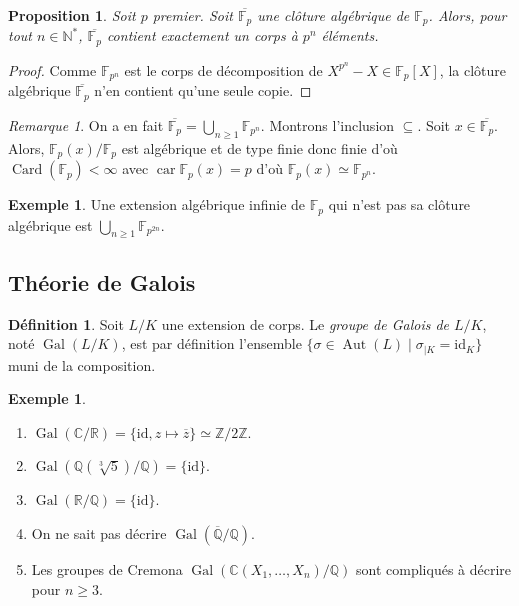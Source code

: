 \documentclass{article}
\newcommand{\id}{\mathrm{id}}
\newcommand{\N}{\mathbb{N}}
\newcommand{\Z}{\mathbb{Z}}
\newcommand{\Q}{\mathbb{Q}}
\newcommand{\Qbar}{\overline{\mathbb{Q}}}
\newcommand{\R}{\mathbb{R}}
\newcommand{\C}{\mathbb{C}}
\newcommand{\F}{\mathbb{F}}
\DeclareMathOperator{\Card}{Card}
\DeclareMathOperator{\Gal}{Gal}
\DeclareMathOperator{\car}{car}
\DeclareMathOperator{\Aut}{Aut}
\theoremstyle{plain}
\newtheorem{proposition}[theorem]{Proposition}
\theoremstyle{definition}
\newtheorem{definition}[theorem]{Définition}
\newtheorem{example}[theorem]{Exemple}
\theoremstyle{remark}
\newtheorem*{remark}{Remarque}
\begin{document}
\begin{proposition}
    Soit $p$ premier. Soit $\overline{\F_p}$ une clôture algébrique de $\F_p$. Alors, pour tout $n \in \N^*$, $\overline{\F_p}$ contient exactement un corps à $p^n$ éléments.
\end{proposition}

\begin{proof}
    Comme $\F_{p^n}$ est le corps de décomposition de $X^{p^n} - X \in \F_p [X]$, la clôture algébrique $\overline{\F_p}$ n'en contient qu'une seule copie.
\end{proof}

\begin{remark}
    On a en fait $\overline{\F_p} = \bigcup\limits_{n\ge 1} \F_{p^n}$. Montrons l'inclusion $\subseteq$. Soit $x\in \overline{\F_p}$. Alors, $\F_p (x) / \F_p$ est algébrique et de type finie donc finie d'où $\Card(\F_p) < \infty$ avec $\car \F_p (x) = p$ d'où $\F_p (x) \simeq \F_{p^n}$.
\end{remark}

\begin{example}
    Une extension algébrique infinie de $\F_p$ qui n'est pas sa clôture algébrique est $\bigcup\limits_{n\ge 1} \F_{p^{2n}}$.
\end{example}

\subsection{Théorie de Galois}

\begin{definition}
    Soit $L/K$ une extension de corps. Le \emph{groupe de Galois de $L/K$}, noté $\Gal(L/K)$, est par définition l'ensemble $\{\sigma \in \Aut(L) \mid \sigma_{\mid K} = \id_K\}$ muni de la composition.
\end{definition}

\begin{example} \leavevmode
    \begin{enumerate}
        \item $\Gal(\C/\R) = \{\id,z\mapsto\overline{z}\} \simeq \Z/2\Z$.
        \item $\Gal(\Q(\sqrt[3]{5})/\Q) = \{\id\}$.
        \item $\Gal(\R/\Q) = \{\id\}$.
        \item On ne sait pas décrire $\Gal(\Qbar/\Q)$.
        \item Les groupes de Cremona $\Gal(\C(X_1,\dots,X_n)/\Q)$ sont compliqués à décrire pour $n\ge 3$.
    \end{enumerate}
\end{example}
\end{document}

